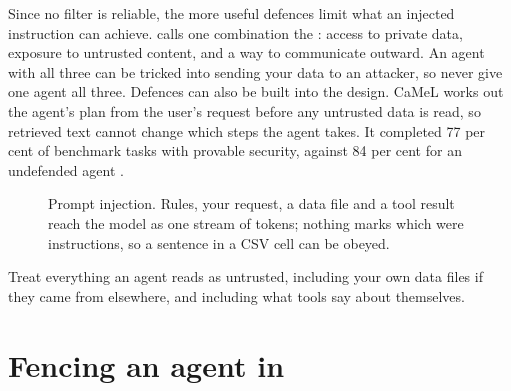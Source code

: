 Since no filter is reliable, the more useful defences limit what an injected
instruction can achieve. \textcite{willison2025trifecta} calls one combination
the : access to private data, exposure to untrusted
content, and a way to communicate outward. An agent with all three can be
tricked into sending your data to an attacker, so never give one agent all
three. Defences can also be built into the design. CaMeL works out the
agent's plan from the user's request before any untrusted data is read, so
retrieved text cannot change which steps the agent takes. It completed 77 per cent of
benchmark tasks with provable security, against 84 per cent for an undefended
agent \parencite{debenedetti2025camel}.

\begin{figure}[htbp]
\centering
{}
\caption{Prompt injection. Rules, your request, a data file and a tool result
reach the model as one stream of tokens; nothing marks which were
instructions, so a sentence in a CSV cell can be obeyed.}
\label{fig:injection}
\end{figure}

\begin{keypoint}
Treat everything an agent reads as untrusted, including your own data files if
they came from elsewhere, and including what tools say about themselves.
\end{keypoint}

\section{Fencing an agent in}

